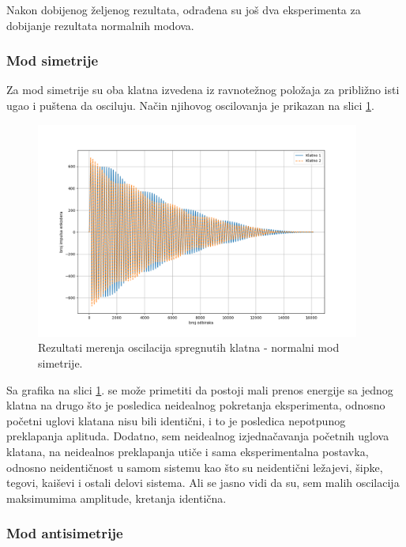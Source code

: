 \documentclass[a4paper, 12pt, diplomski]{etf}
\begin{document}
\noindent
Nakon dobijenog željenog rezultata, odrađena su još dva eksperimenta za dobijanje rezultata normalnih modova.


\subsubsection{Mod simetrije}

Za mod simetrije su oba klatna izvedena iz ravnotežnog položaja za približno isti ugao i puštena da osciluju. Način njihovog oscilovanja je prikazan na slici \ref{rez3}.


\begin{figure}[h!]
    \centering
    \includegraphics[width=0.95\textwidth]{py_rez/klatno_sim.png}
    \caption{Rezultati merenja oscilacija spregnutih klatna - normalni mod simetrije.}
    \label{rez3}
\end{figure}


\noindent
Sa grafika na slici \ref{rez3}. se može primetiti da postoji mali prenos energije sa jednog klatna na drugo što je posledica neidealnog pokretanja eksperimenta, odnosno početni uglovi klatana nisu bili identični, i to je posledica nepotpunog preklapanja aplituda. Dodatno, sem neidealnog izjednačavanja početnih uglova klatana, na neidealnos preklapanja utiče i sama eksperimentalna postavka, odnosno neidentičnost u samom sistemu kao što su neidentični ležajevi, šipke, tegovi, kaiševi i ostali delovi sistema. Ali se jasno vidi da su, sem malih oscilacija maksimumima amplitude, kretanja identična.


\subsubsection{Mod antisimetrije}
\end{document}
